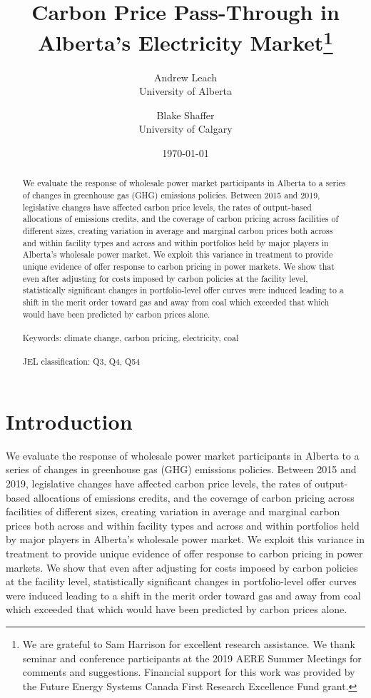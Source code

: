 \documentclass[12pt]{article}
\title{Carbon Price Pass-Through in Alberta's Electricity Market\thanks{We are grateful to Sam Harrison for excellent
research assistance. We thank seminar and conference participants at the 2019 AERE Summer Meetings for comments and suggestions. Financial support for this work was provided by the Future Energy Systems Canada First Research Excellence Fund grant.
}
}
\date{\today}
\author{Andrew Leach\\
 University of Alberta
 \and
Blake Shaffer\\University of Calgary}
\begin{document}
\maketitle




\begin{abstract}
\noindent We evaluate the response of wholesale power market participants in Alberta to a series of changes in greenhouse gas (GHG) emissions policies.  Between 2015 and 2019, legislative changes have affected carbon price levels, the rates of output-based allocations of emissions credits, and the coverage of carbon pricing across facilities of different sizes, creating variation in average and marginal carbon prices both across and within facility types and across and within portfolios held by major players in Alberta's wholesale power market. We exploit this variance in treatment to provide unique evidence of offer response to carbon pricing in power markets. We show that even after adjusting for costs imposed by carbon policies at the facility level, statistically significant changes in portfolio-level offer curves were induced leading to a shift in the merit order toward gas and away from coal which exceeded that which would have been predicted by carbon prices alone.\\ \\
Keywords: climate change, carbon pricing, electricity, coal\\ \\
JEL classification: Q3, Q4, Q54
\end{abstract}

\thispagestyle{empty}
\newpage
\onehalfspacing


\section{Introduction}

We evaluate the response of wholesale power market participants in Alberta to a series of changes in greenhouse gas (GHG) emissions policies.  Between 2015 and 2019, legislative changes have affected carbon price levels, the rates of output-based allocations of emissions credits, and the coverage of carbon pricing across facilities of different sizes, creating variation in average and marginal carbon prices both across and within facility types and across and within portfolios held by major players in Alberta's wholesale power market. We exploit this variance in treatment to provide unique evidence of offer response to carbon pricing in power markets. We show that even after adjusting for costs imposed by carbon policies at the facility level, statistically significant changes in portfolio-level offer curves were induced leading to a shift in the merit order toward gas and away from coal which exceeded that which would have been predicted by carbon prices alone.
\end{document}

